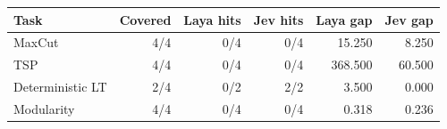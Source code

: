 \begin{tabular}{lrrrrr}
\toprule
Task & Covered & Laya hits & Jev hits & Laya gap & Jev gap \\
\midrule
MaxCut & 4/4 & 0/4 & 0/4 & 15.250 & 8.250 \\
TSP & 4/4 & 0/4 & 0/4 & 368.500 & 60.500 \\
Deterministic LT & 2/4 & 0/2 & 2/2 & 3.500 & 0.000 \\
Modularity & 4/4 & 0/4 & 0/4 & 0.318 & 0.236 \\
\bottomrule
\end{tabular}
